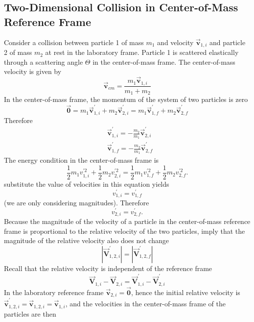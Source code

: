\subsection{ Two-Dimensional Collision in Center-of-Mass Reference Frame}
Consider a collision between particle 1 of mass $m_{1}$ and velocity $\overrightarrow{\mathbf{v}}_{1, i}$ and particle 2 of mass $m_{2}$ at rest in the laboratory frame. Particle 1 is scattered elastically through a scattering angle $\Theta$ in the center-of-mass frame. The center-of-mass velocity is given by\\
$$\overrightarrow{\mathbf{v}}_{c m}=\frac{m_{1} \overrightarrow{\mathbf{v}}_{1, i}}{m_{1}+m_{2}}$$
In the center-of-mass frame, the momentum of the system of two particles is zero
$$
\overrightarrow{\mathbf{0}}=m_{1} \overrightarrow{\mathbf{v}}_{1, i}^{\prime}+m_{2} \overrightarrow{\mathbf{v}}_{2, i}^{\prime}=m_{1} \overrightarrow{\mathbf{v}}_{1, f}^{\prime}+m_{2} \overrightarrow{\mathbf{v}}_{2, f}^{\prime}
$$
Therefore
$$
\begin{aligned}
&\overrightarrow{\mathbf{v}}_{1, i}^{\prime}=-\frac{m_{2}}{m_{1}} \overrightarrow{\mathbf{v}}_{2, i}^{\prime} \\
&\overrightarrow{\mathbf{v}}_{1, f}^{\prime}=-\frac{m_{2}}{m_{1}} \overrightarrow{\mathbf{v}}_{2, f}^{\prime}
\end{aligned}
$$
The energy condition in the center-of-mass frame is
$$
\frac{1}{2} m_{1} v_{1, i}^{\prime 2}+\frac{1}{2} m_{2} v_{2, i}^{\prime 2}=\frac{1}{2} m_{1} v_{1, f}^{\prime 2}+\frac{1}{2} m_{2} v_{2, f}^{\prime 2} .
$$
substitute the value of velocities in this equation yields\\
$$v_{1, i}^{\prime}=v_{1, f}^{\prime}$$
(we are only considering magnitudes). Therefore
$$
v_{2, i}^{\prime}=v_{2, f}^{\prime} .
$$
Because the magnitude of the velocity of a particle in the center-of-mass reference frame is proportional to the relative velocity of the two particles, imply that the magnitude of the relative velocity also does not change\\
$$\left|\overrightarrow{\mathbf{V}}_{1,2, i}^{\prime}\right|=\left|\overrightarrow{\mathbf{V}}_{1,2, f}^{\prime}\right|$$
 Recall that the relative velocity is independent of the reference frame\\
 $$\overrightarrow{\mathbf{V}}_{1, i}-\overrightarrow{\mathbf{V}}_{2, i}=\overrightarrow{\mathbf{V}}_{1, i}^{\prime}-\overrightarrow{\mathbf{V}}_{2, i}^{\prime}$$
 In the laboratory reference frame $\overrightarrow{\mathbf{v}}_{2, i}=\overrightarrow{\mathbf{0}}$, hence the initial relative velocity is $\overrightarrow{\mathbf{v}}_{1,2, i}^{\prime}=\overrightarrow{\mathbf{v}}_{1,2, i}=\overrightarrow{\mathbf{v}}_{1, i}$, and the velocities in the center-of-mass frame of the particles are then
